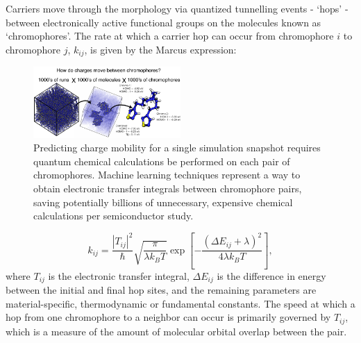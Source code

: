 \documentclass[12pt]{article}
\begin{document}
Carriers move through the morphology via quantized tunnelling events - `hops' - between electronically active functional groups on the molecules known as `chromophores'.
The rate at which a carrier hop can occur from chromophore $i$ to chromophore $j$, $k_{ij}$, is given by the Marcus expression\cite{Marcus1964}:
\begin{figure}\centering
	\includegraphics[width=0.5\textwidth]{Figures/fig.png}
    \caption{Predicting charge mobility for a single simulation snapshot requires quantum chemical calculations be performed on each pair of chromophores. Machine learning techniques represent a way to obtain electronic transfer integrals between chromophore pairs, saving potentially billions of unnecessary, expensive chemical calculations per semiconductor study.}
	\label{fig:fig1}
\end{figure}
\begin{equation}\label{eq:Marcus}
    k_{ij} = \frac{\left| T_{ij} \right|^{2}}{\hbar} \sqrt{\frac{\pi}{\lambda k_{B} T}} \exp \left[ - \frac{(\Delta E_{ij} + \lambda)^{2}}{4 \lambda k_{B} T} \right],
\end{equation}
where $T_{ij}$ is the electronic transfer integral, $\Delta E_{ij}$ is the difference in energy between the initial and final hop sites, and the remaining parameters are material-specific, thermodynamic or fundamental constants.
The speed at which a hop from one chromophore to a neighbor can occur is primarily governed by $T_{ij}$, which is a measure of the amount of molecular orbital overlap between the pair.
\end{document}
